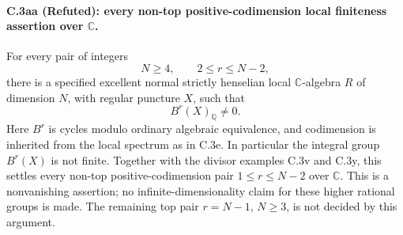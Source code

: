 \paragraph{C.3aa (Refuted): every non-top positive-codimension local finiteness assertion over $\mathbb C$.}
For every pair of integers
\[
                        N\ge4,\qquad 2\le r\le N-2,
\]
there is a specified excellent normal strictly henselian local
$\mathbb C$-algebra $R$ of dimension $N$, with regular puncture
$X$, such that
\begin{equation}\label{eq:C3aa-nonvanishing}
                         B^r(X)_{\mathbb Q}\ne0.
\end{equation}
Here $B^r$ is cycles modulo ordinary algebraic equivalence,
and codimension is inherited from the local spectrum as in
C.3e. In particular the integral group $B^r(X)$ is not
finite. Together with the divisor examples C.3v and C.3y,
this settles every non-top positive-codimension pair
$1\le r\le N-2$ over $\mathbb C$. This is a nonvanishing
assertion; no infinite-dimensionality claim for these
higher rational groups is made. The remaining top pair
$r=N-1$, $N\ge3$, is not decided by this argument.

